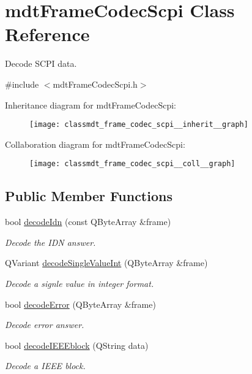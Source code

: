 \hypertarget{classmdt_frame_codec_scpi}{
\section{mdtFrameCodecScpi Class Reference}
\label{classmdt_frame_codec_scpi}
}


Decode SCPI data.  




{\ttfamily \#include $<$mdtFrameCodecScpi.h$>$}



Inheritance diagram for mdtFrameCodecScpi:\nopagebreak
\begin{figure}[H]
\begin{center}
\leavevmode
\texttt{[image: classmdt\_frame\_codec\_scpi\_\_inherit\_\_graph]}
\end{center}
\end{figure}


Collaboration diagram for mdtFrameCodecScpi:\nopagebreak
\begin{figure}[H]
\begin{center}
\leavevmode
\texttt{[image: classmdt\_frame\_codec\_scpi\_\_coll\_\_graph]}
\end{center}
\end{figure}
\subsection*{Public Member Functions}
\begin{DoxyCompactItemize}
\item 
bool \hyperlink{classmdt_frame_codec_scpi_aedbdb078e4f652b17919cff6add22c27}{decodeIdn} (const QByteArray \&frame)
\begin{DoxyCompactList}\small\item\em Decode the IDN answer. \end{DoxyCompactList}\item 
QVariant \hyperlink{classmdt_frame_codec_scpi_a7a2b463fbbd0c8d1d4d9d5c16a49d7bb}{decodeSingleValueInt} (QByteArray \&frame)
\begin{DoxyCompactList}\small\item\em Decode a signle value in integer format. \end{DoxyCompactList}\item 
bool \hyperlink{classmdt_frame_codec_scpi_aa2a184572eae360a274c89f7b8ba33e9}{decodeError} (QByteArray \&frame)
\begin{DoxyCompactList}\small\item\em Decode error answer. \end{DoxyCompactList}\item 
bool \hyperlink{classmdt_frame_codec_scpi_a327afabbb6da25e31523ef4baa28cc87}{decodeIEEEblock} (QString data)
\begin{DoxyCompactList}\small\item\em Decode a IEEE block. \end{DoxyCompactList}\end{DoxyCompactItemize}


